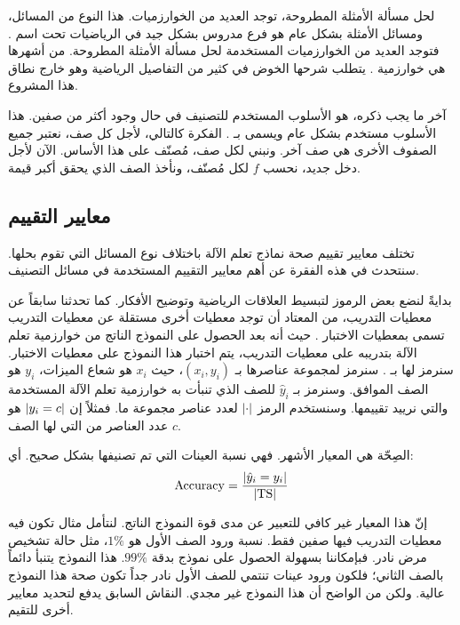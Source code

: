 لحل مسألة الأمثلة المطروحة، توجد العديد من الخوارزميات. هذا النوع من المسائل، ومسائل الأمثلة بشكل عام هو فرع
مدروس بشكل جيد في الرياضيات تحت اسم .
فتوجد العديد من الخوارزميات المستخدمة لحل مسألة الأمثلة المطروحة.
من أشهرها هي خوارزمية
%
. يتطلب شرحها الخوض في كثير من التفاصيل الرياضية وهو خارج نطاق هذا المشروع.

آخر ما يجب ذكره، هو الأسلوب المستخدم للتصنيف في حال وجود أكثر من صفين.
هذا الأسلوب مستخدم بشكل عام ويسمى بـ
%
. الفكرة كالتالي، لأجل كل صف، نعتبر جميع الصفوف الأخرى هي صف آخر.
ونبني لكل صف، مُصنّف على هذا الأساس.
الآن لأجل دخل جديد، نحسب $f$ لكل مُصنّف، ونأخذ الصف الذي يحقق أكبر قيمة.




\subsection{معايير التقييم}
تختلف معايير تقييم صحة نماذج تعلم الآلة باختلاف نوع المسائل التي تقوم بحلها.
سنتحدث في هذه الفقرة عن أهم معايير التقييم المستخدمة في مسائل التصنيف.

بدايةً لنضع بعض الرموز لتبسيط العلاقات الرياضية وتوضيح الأفكار.
كما تحدثنا سابقاً عن معطيات التدريب،
من المعتاد أن توجد معطيات أخرى مستقلة عن معطيات التدريب تسمى بمعطيات الاختبار .
حيث أنه بعد الحصول على النموذج الناتج من خوارزمية تعلم الآلة بتدريبه على معطيات التدريب،
يتم اختبار هذا النموذج على معطيات الاختبار.
سنرمز لها بـ .
سنرمز لمجموعة عناصرها بـ $ (x_i, y_i) $، حيث $x_i$ هو شعاع الميزات، $y_i$ هو الصف الموافق.
وسنرمز بـ $\hat{y}_i$ للصف الذي تنبأت به خوارزمية تعلم الآلة المستخدمة والتي نرييد تقييمها.
وسنستخدم الرمز $ \left\vert\cdot\right\vert $ لعدد عناصر مجموعة ما.
فمثلاً إن $ \left\vert y_i = c\right\vert $ هو عدد العناصر من  التي لها الصف $c$.

الصِحّة  هي المعيار الأشهر. فهي نسبة العينات التي تم تصنيفها بشكل صحيح. أي:
$$ \mathrm{Accuracy} = \frac{ \left\vert\hat{y}_i = y_i\right\vert }{ \left\vert \mathrm{TS} \right\vert } $$

إنّ هذا المعيار غير كافي للتعبير عن مدى قوة النموذج الناتج.
لنتأمل مثال تكون فيه معطيات التدريب فيها صفين فقط.
نسبة ورود الصف الأول هو $1\%$،
مثل حالة تشخيص مرض نادر.
فبإمكاننا بسهولة الحصول على نموذج بدقة $99\%$.
هذا النموذج يتنبأ دائماً بالصف الثاني؛
فلكون ورود عينات تنتمي للصف الأول نادر جداً تكون صحة هذا النموذج عالية.
ولكن من الواضح أن هذا النموذج غير مجدي.
النقاش السابق يدفع لتحديد معايير أخرى للتقيم.

